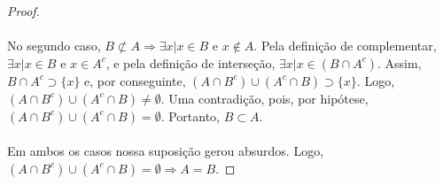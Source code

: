 \documentclass[11pt,a4paper]{report}
\begin{document}
\begin{proof}
    \paragraph{}
    No segundo caso, $B \not\subset A \Rightarrow \exists x | x \in B$ e $x \not\in A$. Pela definição de complementar, $\exists x | x \in B$ e $x \in A^c$, e pela definição de interseção, $\exists x | x \in (B \cap A^c)$. Assim, $B \cap A^c \supset \{x\}$ e, por conseguinte, $(A \cap B^c) \cup (A^c \cap B) \supset \{x\}$. Logo, $(A \cap B^c) \cup (A^c \cap B) \not= \emptyset$. Uma contradição, pois, por hipótese, $(A \cap B^c) \cup (A^c \cap B) = \emptyset$. Portanto, $B \subset A$.

    \paragraph{}
    Em ambos os casos nossa suposição gerou absurdos. Logo, $(A \cap B^c) \cup (A^c \cap B) = \emptyset \Rightarrow A = B$.
    \end{proof}
\end{document}
